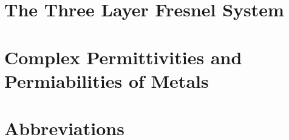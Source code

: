 \documentclass[a4paper,titlepage,onecolumn]{report}
\begin{document}
\section{The Three Layer Fresnel System}

\section{Complex Permittivities and Permiabilities of Metals}


\section{Abbreviations}




\listoftodos
\end{document}

